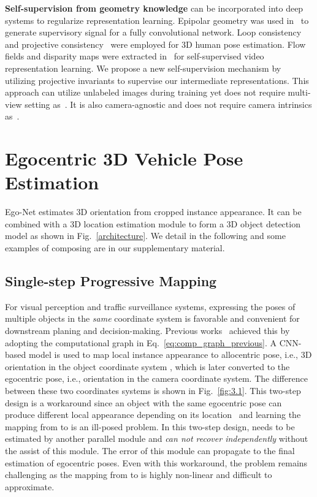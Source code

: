 \documentclass[final]{cvpr}
\begin{document}
\noindent \textbf{Self-supervision from geometry knowledge} can be incorporated into deep systems to regularize representation learning. Epipolar geometry was used in~\cite{kocabas2019self} to generate supervisory signal for a fully convolutional network. Loop consistency~\cite{chen2019unsupervised} and projective consistency~\cite{habibie2019wild} were employed for 3D human pose estimation. Flow fields and disparity maps were extracted in~\cite{gan2018geometry} for self-supervised video representation learning. We propose a new self-supervision mechanism by utilizing projective invariants to supervise our intermediate representations. This approach can utilize unlabeled images during training yet does not require multi-view setting as~\cite{kocabas2019self}. It is also camera-agnostic and does not require camera intrinsics as~\cite{habibie2019wild}.



\section{Egocentric 3D Vehicle Pose Estimation}
\label{MA}
Ego-Net  estimates 3D orientation from cropped instance appearance. It can be combined with a 3D location estimation module  to form a 3D object detection model  as shown in Fig.~\ref{architecture}. We detail  in the following and some examples of composing  are in our supplementary material. 

\subsection{Single-step Progressive Mapping}
\label{Ego-Net}
For visual perception and traffic surveillance systems, expressing the poses of multiple objects in the \emph{same} coordinate system is favorable and convenient for downstream planing and decision-making. Previous works~\cite{mousavian20173d, kundu20183d, brazil2019m3d, Ding_2020_CVPR} achieved this by adopting the computational graph in Eq.~\ref{eq:comp_graph_previous}. A CNN-based model  is used to map local instance appearance  to allocentric pose, i.e., 3D orientation in the object coordinate system , which is later converted to the egocentric pose, i.e., orientation in the camera coordinate system. The difference between these two coordinates systems is shown in Fig.~\ref{fig:3.1}. This two-step design is a workaround since an object with the same egocentric pose  can produce different local appearance depending on its location~\cite{kundu20183d} and learning the mapping from  to  is an ill-posed problem. In this two-step design,  needs to be estimated by another parallel module and  \emph{can not recover  independently} without the assist of this module. The error of this module can propagate to the final estimation of egocentric poses. Even with this workaround, the problem remains challenging as the mapping from  to  is highly non-linear and difficult to approximate.
\end{document}
